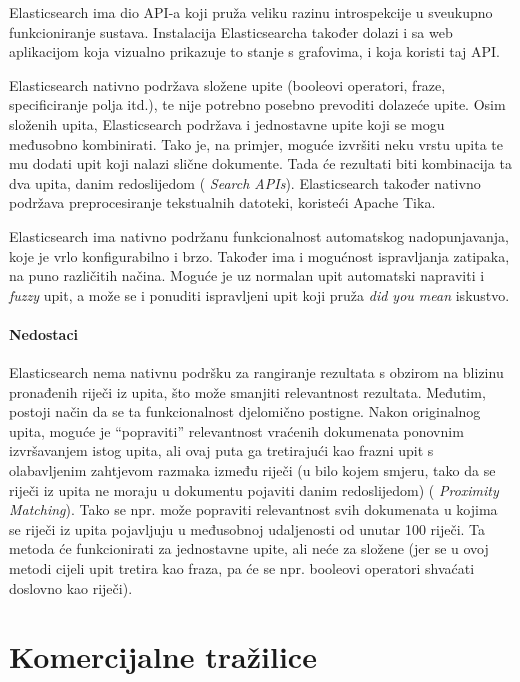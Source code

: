 \documentclass[a4paper,twoside,12pt]{scrreprt}
\begin{document}
Elasticsearch ima dio API-a koji pruža veliku razinu introspekcije u sveukupno funkcioniranje sustava. Instalacija Elasticsearcha također dolazi i sa web aplikacijom koja vizualno prikazuje to stanje s grafovima, i koja koristi taj API.

Elasticsearch nativno podržava složene upite (booleovi operatori, fraze, specificiranje polja itd.), te nije potrebno posebno prevoditi dolazeće upite. Osim složenih upita, Elasticsearch podržava i jednostavne upite koji se mogu međusobno kombinirati. Tako je, na primjer, moguće izvršiti neku vrstu upita te mu dodati upit koji nalazi slične dokumente. Tada će rezultati biti kombinacija ta dva upita, danim redoslijedom (\cite{elasticref} \textit{Search APIs}). Elasticsearch također nativno podržava preprocesiranje tekstualnih datoteki, koristeći Apache Tika.

Elasticsearch ima nativno podržanu funkcionalnost automatskog nadopunjavanja, koje je vrlo konfigurabilno i brzo. Također ima i mogućnost ispravljanja zatipaka, na puno različitih načina. Moguće je uz normalan upit automatski napraviti i \textit{fuzzy} upit, a može se i ponuditi ispravljeni upit koji pruža \textit{did you mean} iskustvo.

\subsubsection{Nedostaci}

Elasticsearch nema nativnu podršku za rangiranje rezultata s obzirom na blizinu pronađenih riječi iz upita, što može smanjiti relevantnost rezultata. Međutim, postoji način da se ta funkcionalnost djelomično postigne. Nakon originalnog upita, moguće je ``popraviti'' relevantnost vraćenih dokumenata ponovnim izvršavanjem istog upita, ali ovaj puta ga tretirajući kao frazni upit s olabavljenim zahtjevom razmaka između riječi (u bilo kojem smjeru, tako da se riječi iz upita ne moraju u dokumentu pojaviti danim redoslijedom) (\cite{elasticguide} \textit{Proximity Matching}). Tako se npr. može popraviti relevantnost svih dokumenata u kojima se riječi iz upita pojavljuju u međusobnoj udaljenosti od unutar 100 riječi. Ta metoda će funkcionirati za jednostavne upite, ali neće za složene (jer se u ovoj metodi cijeli upit tretira kao fraza, pa će se npr. booleovi operatori shvaćati doslovno kao riječi).

\chapter{Komercijalne tražilice}
\end{document}
